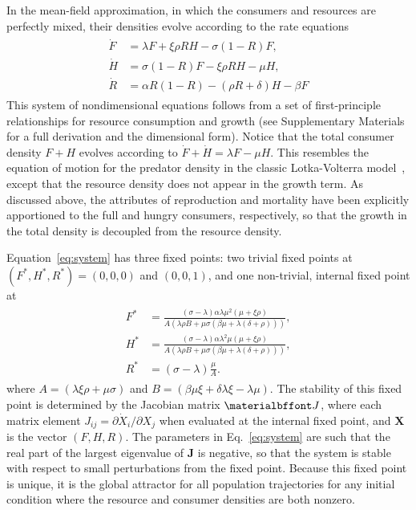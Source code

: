 \documentclass{pnastwo}
\begin{document}
\begin{article}
In the mean-field approximation, in which the consumers and resources are perfectly mixed, their densities evolve according to the rate equations
\begin{align}
\label{eq:system}
\begin{split}
\dot{F} &= \lambda F + \xi \rho RH - \sigma \left(1-R\right)F,  \\
\dot{H} &= \sigma \left(1-R\right)F - \xi \rho RH - \mu H,  \\
\dot{R} &= \alpha R\left(1-R\right) -\left(\rho R+\delta\right)H-\beta F
\end{split}
\end{align}
This system of nondimensional equations follows from a set of first-principle relationships for resource consumption and growth (see Supplementary Materials for a full derivation and the dimensional form).
Notice that the total consumer density $F+H$ evolves according to $\dot{F}+\dot{H}=\lambda F-\mu H$.
This resembles the equation of motion for the predator density in the classic Lotka-Volterra model~\cite{murray2011mathematical}, except that the resource density does not appear in the growth term.
As discussed above, the attributes of reproduction and mortality have been explicitly apportioned to the full and hungry consumers, respectively, so that the growth in the total density is decoupled from the resource density.

Equation~\eqref{eq:system} has three fixed points: two trivial fixed points at $(F^*,H^*,R^*)=(0,0,0)$ and $(0,0,1)$, and one non-trivial, internal fixed point at
\begin{align}
\label{eq:ss}
\begin{split}
F^* &= \frac{(\sigma-\lambda) \alpha  \lambda  \mu ^2  (\mu +\xi  \rho )}{A (\lambda  \rho  B+\mu  \sigma  (\beta  \mu +\lambda  (\delta +\rho )))}, \\
H^* &= \frac{(\sigma-\lambda) \alpha  \lambda ^2 \mu  (\mu +\xi  \rho )}{A (\lambda  \rho  B+\mu  \sigma  (\beta  \mu +\lambda  (\delta +\rho )))}, \\
R^* &= (\sigma - \lambda)\frac{\mu  }{A}.
\end{split}
\end{align}
where $A=(\lambda  \xi  \rho +\mu  \sigma )$ and $B=(\beta  \mu  \xi +\delta  \lambda  \xi -\lambda  \mu )$. The stability of this fixed point is determined by the Jacobian matrix $\bf J$, where each matrix element $J_{ij}=\partial{\dot X_i}/\partial{X_j}$ when evaluated at the internal fixed point, and $\mathbf{X}$ is the vector $(F,H,R)$.
The parameters in Eq.~\eqref{eq:system} are such that the real part of the largest eigenvalue of $\mathbf{J}$ is negative, so that the system is stable with respect to small perturbations from the fixed point.
Because this fixed point is unique, it is the global attractor for all population trajectories for any initial condition where the resource and consumer densities are both nonzero.


\end{article}
\end{document}
